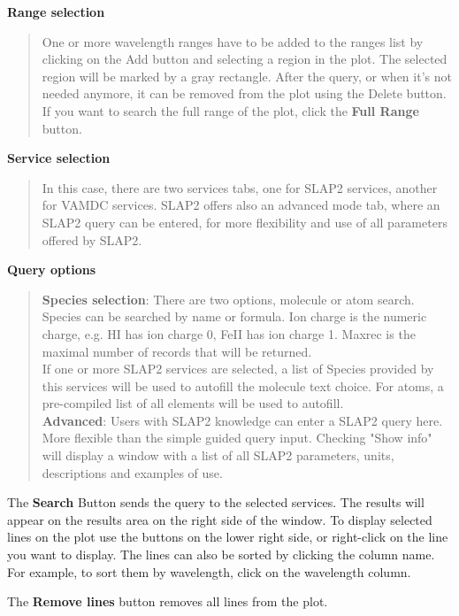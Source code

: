 \documentclass[twoside,11pt,nolof]{starlink}
\providecommand{\subheading}[1]{\textbf{\large{#1}}}
\begin{document}
\subheading{Range selection}
\begin{quote}
One or more wavelength ranges have to be added to the ranges list by clicking on the {Add} button and selecting a region
in the plot. The selected region will be marked by a gray rectangle. After the query,  or when it's not needed anymore, it can be removed from  the plot using the {Delete} button. If you want to search the full range of the plot, click the \textbf{Full Range} button. 
\end{quote}

\subheading{Service selection}
\begin{quote}
In this case, there are two services tabs, one for SLAP2 services, another 
for VAMDC services. SLAP2 offers also an advanced mode tab, where an SLAP2 query can be entered,
for more flexibility and use of all parameters offered by SLAP2.
\end{quote}



\subheading{Query options}
\begin{quote}

\textbf{Species selection}: There are two options, molecule or atom search. 
Species  can be searched by name or formula.  Ion charge is the numeric charge, e.g. HI has ion charge 0, FeII has ion charge 1.
Maxrec is the maximal number of records that will be returned.\\
If one or more SLAP2 services are selected, a list of Species provided by this services will be used to autofill the molecule text choice.
For atoms, a pre-compiled list of all elements will be used to autofill.
 \\
\textbf{Advanced}:  Users with SLAP2 knowledge can enter a SLAP2 query here. More flexible than the simple guided query input.
Checking "Show info" will display a window with a list of all SLAP2 parameters, units, descriptions and examples of use.
\end{quote}


The \textbf{Search} Button sends the query to the selected services. The results will appear on the
results area on the right side of the window. To display selected lines on the plot
use the buttons on the lower right side, or right-click on the line you want to display.
The lines can also be sorted by clicking the column name. For example, to sort them by wavelength,
click on the wavelength column.

The \textbf{Remove lines} button removes all lines from the plot.
\end{document}
